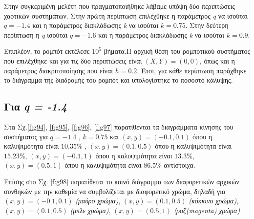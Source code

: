 Στην συγκεριμένη μελέτη που πραγματοποιήθηκε λάβαμε υπόψη δύο περιπτώσεις χαοτικών συστημάτων.
Στην πρώτη περίπτωση επιλέχθηκε η παράμετρος \emph{q} να ισούται $q = -1.4$ και η παράμετρος διακλάδωσης \emph{k} να ισούται $k = 0.75$. Στην δεύτερη περίπτωση  η \emph{q} ισούται $q = -1.6$ και η παράμετρος διακλάδωσης  \emph{k} να ισούται $k = 0.9$. 

Επιπλέον, το ρομπότ εκτέλεσε $10^5$ βήματα.Η αρχική θέση του ρομποτικού συστήματος που επιλέχθηκε και για τις δύο περιπτώσεις είναι  $(X,Y) = (0,0)$, όπως και η παράμετρος διακριτοποίησης που είναι $h = 0.2$. Έτσι, για κάθε περίπτωση παράχθηκε το διάγραμμα της διαδρομής του ρομπότ και υπολογίστηκε το ποσοστό κάλυψης.

\subsection{Για \emph{q = -1.4}}

Στα Σχ.\ref{f:g94}, \ref{f:g95}, \ref{f:g96}, \ref{f:g97} παρατίθενται τα διαγράμματα κίνησης του συστήματος για $q =-1.4$ , $k = 0.75$ και $(x,y) = (-0.1,0.1)$ όπου η καλυψιμότητα είναι $10.35\%$ , $(x,y) = (0.1,0.5)$ όπου η καλυψιμότητα είναι $15.23\%$, $(x,y) = (-0.1,1)$ όπου η καλυψιμότητα είναι $13.3\%$, $(x,y) = (0.5,1)$ όπου η καλυψιμότητα είναι $86.5\%$ αντίστοιχα.

Επίσης στο Σχ. \ref{f:g98} παρατίθεται το κοινό διάγραμμα των διαφορετικών αρχικών συνθηκών με την καθεμία να συμβολίζεται με διαφορετικό χρώμα, δηλαδή για $(x,y) = (-0.1,0.1)$ \emph{(μαύρο χρώμα)}, $(x,y) = (0.1,0.5)$ \emph{(κόκκινο χρώμα)}, $(x,y) = (0.1,0.5)$ \emph{(μπλε χρώμα)}, $(x,y) = (0.5,1)$ \emph{(ροζ(magenta) χρώμα)}

